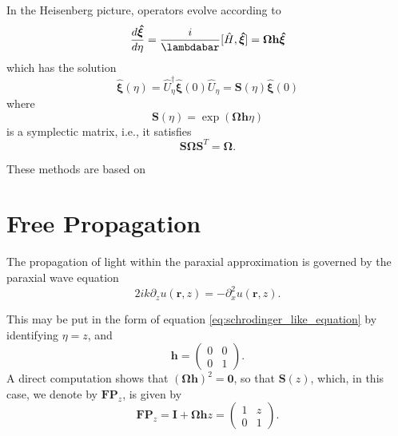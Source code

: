 \documentclass[a4paper,10pt]{report}
\begin{document}
In the Heisenberg picture, operators evolve according to
\begin{equation}
\frac{d\boldsymbol{\hat{\xi}}}{d\eta} = \frac{i}{\lambdabar} [\hat{H}, \boldsymbol{\hat{\xi}}] = \boldsymbol{\Omega} \mathbf{h} \boldsymbol{\hat{\xi}}
\end{equation}
which has the solution
\begin{equation}
    \label{eq:double_covering}
\boldsymbol{\hat{\xi}}(\eta) = \hat{U}_\eta^\dagger \boldsymbol{\hat{\xi}}(0) \hat{U}_\eta  = \mathbf{S}(\eta) \boldsymbol{\hat{\xi}}(0)
\end{equation}
where
\begin{equation}\mathbf{S}(\eta) = \exp(\boldsymbol{\Omega} \mathbf{h} \eta)\end{equation}
is a symplectic matrix, i.e., it satisfies
\begin{equation}\mathbf{S}\boldsymbol{\Omega} \mathbf{S}^T = \boldsymbol{\Omega}.\end{equation}

These methods are based on \cite{Stoler:81,Nazarathy:82}

\section{Free Propagation}

The propagation of light within the paraxial approximation is governed by the paraxial wave equation
\begin{equation}
    2ik\partial_z u(\mathbf{r}, z) = -\partial_x^2 u(\mathbf{r}, z).
\end{equation}

This may be put in the form of equation \eqref{eq:schrodinger_like_equation} by identifying $\eta = z$, and
\begin{equation}
    \mathbf{h} = \begin{pmatrix}
        0 & 0 \\
        0 & 1
    \end{pmatrix} .
\end{equation}
A direct computation shows that $(\boldsymbol{\Omega}\mathbf{h})^2 = \boldsymbol{0}$, so that $\mathbf{S}(z)$, which, in this case, we denote by $\mathbf{FP}_z$, is given by
\begin{equation}
    \mathbf{FP}_z = \boldsymbol{I} + \boldsymbol{\Omega}\mathbf{h} z = \begin{pmatrix}
        1 & z \\
        0 & 1
    \end{pmatrix} .
\end{equation}
\end{document}
